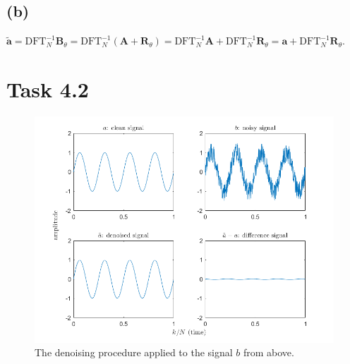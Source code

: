 \documentclass[12pt]{article}
\begin{document}
\subsection*{(b)}
$\tilde{\mathbf{a}} = \text{DFT}_{N}^{-1}\mathbf{B}_{\theta} = \text{DFT}_{N}^{-1}(\mathbf{A}+\mathbf{R}_{\theta}) = 
\text{DFT}_{N}^{-1}\mathbf{A} + \text{DFT}_{N}^{-1}\mathbf{R}_{\theta} = \mathbf{a} + \text{DFT}_{N}^{-1}\mathbf{R}_{\theta}$.


\section*{Task 4.2}

\begin{figure}[h]
    \centering
    \includegraphics[width=\textwidth]{denoise.png}
    \caption{The denoising procedure applied to the signal $b$ from above.}
    \label{fig:my_label}
\end{figure}
\end{document}
